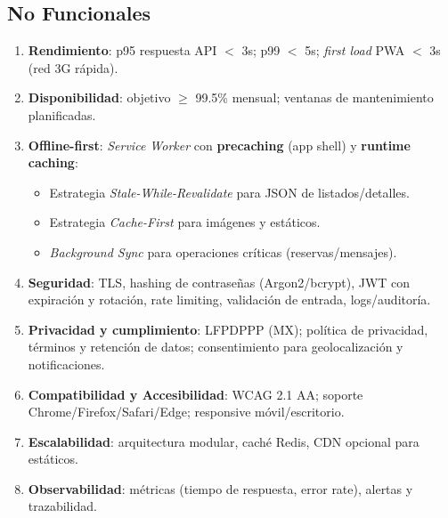 \documentclass[12pt]{article}
\begin{document}
\subsection{No Funcionales}
\begin{enumerate}[label=\textbf{NF-\arabic*}, left=0pt, itemsep=4pt]
  \item \textbf{Rendimiento}: p95 respuesta API $<$ 3s; p99 $<$ 5s; \textit{first load} PWA $<$ 3s (red 3G rápida).
  \item \textbf{Disponibilidad}: objetivo $\geq$ 99.5\% mensual; ventanas de mantenimiento planificadas.
  \item \textbf{Offline-first}: \textit{Service Worker} con \textbf{precaching} (app shell) y \textbf{runtime caching}:
    \begin{itemize}[nosep]
      \item Estrategia \emph{Stale-While-Revalidate} para JSON de listados/detalles.
      \item Estrategia \emph{Cache-First} para imágenes y estáticos.
      \item \textit{Background Sync} para operaciones críticas (reservas/mensajes).
    \end{itemize}
  \item \textbf{Seguridad}: TLS, hashing de contraseñas (Argon2/bcrypt), JWT con expiración y rotación, rate limiting, validación de entrada, logs/auditoría.
  \item \textbf{Privacidad y cumplimiento}: LFPDPPP (MX); política de privacidad, términos y retención de datos; consentimiento para geolocalización y notificaciones.
  \item \textbf{Compatibilidad y Accesibilidad}: WCAG 2.1 AA; soporte Chrome/Firefox/Safari/Edge; responsive móvil/escritorio.
  \item \textbf{Escalabilidad}: arquitectura modular, caché Redis, CDN opcional para estáticos.
  \item \textbf{Observabilidad}: métricas (tiempo de respuesta, error rate), alertas y trazabilidad.
\end{enumerate}
\end{document}
